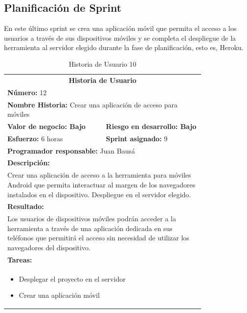 	\subsection{Planificación de Sprint}
	En este último sprint se crea una aplicación móvil que permita el acceso a los usuarios a través de sus dispositivos móviles y se completa el despliegue de la herramienta al servidor elegido durante la fase de planificación, esto es, Heroku.
	
		\begin{table}[H]
	  \centering 
	 	\begin{tabular}{p{0.4\linewidth}p{0.4\linewidth}}
	    \toprule
	    \multicolumn{2}{c}{\cellcolor{black!30}\textbf{Historia de Usuario}} 													\\
		\multicolumn{2}{l}{\cellcolor{gray!25}\textbf{Número: }12}																\\
		\multicolumn{2}{l}{\textbf{Nombre Historia: } Crear una aplicación de acceso para móviles}						\\
		\cellcolor{gray!25}\textbf{Valor de negocio: Bajo}	&	\cellcolor{gray!25}\textbf{Riesgo en desarrollo: Bajo}	\\
		\textbf{Esfuerzo:} 6 horas				&	\textbf{Sprint asignado: }9 												\\
		\multicolumn{2}{l}{\cellcolor{gray!25}\textbf{Programador responsable: }Juan Bausá}									\\
		\multicolumn{2}{l}{\textbf{Descripción:}}                                                     						\\
		\multicolumn{2}{l}{\parbox{15cm}{Crear una aplicación de acceso a la herramienta para móviles Android que permita interactuar al margen de los navegadores instalados en el dispositivo. Despliegue en el servidor elegido.}}				\\
		\multicolumn{2}{l}{\cellcolor{gray!25}\textbf{Resultado:}}																\\		
		\multicolumn{2}{l}{\parbox{15cm}{Los usuarios de dispositivos móviles podrán acceder a la herramienta a través de una aplicación dedicada en sus teléfonos que permitirá el acceso sin necesidad de utilizar los navegadores del dispositivo.}}																								\\
		\multicolumn{2}{l}{\textbf{Tareas:}}																					\\
		\multicolumn{2}{l}{
			\begin{minipage}{12cm}
	    		\vskip 4pt
	    		\begin{itemize}
	    			\item Desplegar el proyecto en el servidor
	    			\item Crear una aplicación móvil
				\end{itemize}
			  	\vskip 4pt
		 	\end{minipage}
		} \\																				
	    \hline
	  \end{tabular}
	  \caption{Historia de Usuario 10}
	\end{table}
	
